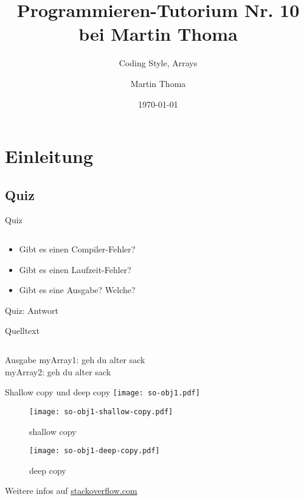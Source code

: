 \documentclass[usepdftitle=false,hyperref={pdfpagelabels=false}]{beamer}
\institute{Fakultät für Informatik}
\newcommand\tutor{Martin Thoma}
\newcommand\tutNR{10}
\newcommand\titleText{Programmieren-Tutorium Nr. \tutNR{} bei \tutor}
\begin{document}
\title{\titleText}
\subtitle{Coding Style, Arrays}
\author{\tutor}
\date{\today}
\subject{Programmieren}

\frame{\titlepage}


\section{Einleitung}
\subsection{Quiz}
\begin{frame}{Quiz}
    \inputminted[linenos=true, numbersep=5pt, tabsize=4, fontsize=\small, label=QuizArray.java, frame=lines]{java}{QuizArray.java}
    \begin{itemize}
        \item Gibt es einen Compiler-Fehler?
        \item Gibt es einen Laufzeit-Fehler?
        \item Gibt es eine Ausgabe? Welche?
    \end{itemize}
\end{frame}

\begin{frame}{Quiz: Antwort}
    \begin{block}{Quelltext}
        \inputminted[linenos=true, numbersep=5pt, tabsize=4, fontsize=\tiny]{java}{QuizArray.java}
    \end{block}

    \begin{block}{Ausgabe}
        myArray1:  geh  du alter sack\\
        myArray2:  geh  du alter sack
    \end{block}
\end{frame}

\begin{frame}{Shallow copy und deep copy}
    \texttt{[image: so-obj1.pdf]}

    \begin{minipage}[b]{0.45\linewidth}
    \begin{figure}[htb]
        \texttt{[image: so-obj1-shallow-copy.pdf]}
        \caption{shallow copy}
        \label{UploadForm}
    \end{figure}
    \end{minipage}
    \hspace{0.5cm}
    \begin{minipage}[b]{0.45\linewidth}
    \begin{figure}[htb]
        \texttt{[image: so-obj1-deep-copy.pdf]}
        \caption{deep copy}
        \label{UploadForm}
    \end{figure}
    \end{minipage}

    \tiny{Weitere infos auf \href{http://stackoverflow.com/a/9835954/562769}{stackoverflow.com}}
\end{frame}
\end{document}
